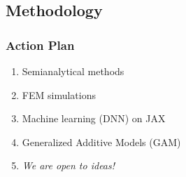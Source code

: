 \documentclass{beamer}
\begin{document}
    \subsection{Methodology}
    \begin{frame}
        \frametitle{Action Plan}
        \begin{enumerate}
            \item<1-> Semianalytical methods
            \item<2-> FEM simulations
            \item<3-> Machine learning (DNN) on JAX
            \item<4-> Generalized Additive Models (GAM)
            \item<5-> \emph{We are open to ideas!}
        \end{enumerate}
    \end{frame}
\end{document}
